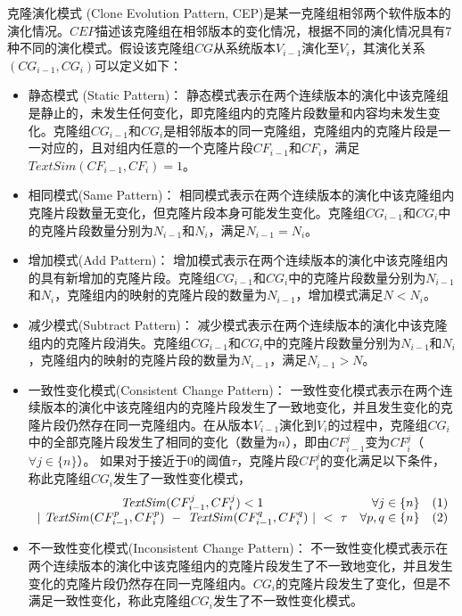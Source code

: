 \begin{definition}[克隆演化模式]
\label{def-evolutionpattern}
克隆演化模式 (Clone Evolution Pattern, CEP)是某一克隆组相邻两个软件版本的演化情况。$CEP$描述该克隆组在相邻版本的变化情况，根据不同的演化情况具有7种不同的演化模式。假设该克隆组$CG$从系统版本$V_{i-1}$演化至$V_{i}$，其演化关系$(CG_{i-1},CG_{i})$可以定义如下：
\begin{itemize}
\item 
静态模式 (Static Pattern)：
静态模式表示在两个连续版本的演化中该克隆组是静止的，未发生任何变化，即克隆组内的克隆片段数量和内容均未发生变化。克隆组$CG_{i-1}$和$CG_{i}$是相邻版本的同一克隆组，克隆组内的克隆片段是一一对应的，且对组内任意的一个克隆片段$CF_{i-1}$和$CF_{i}$，满足$\mathit{TextSim}(CF_{i-1}, CF_i) =1$。

\item 
相同模式(Same Pattern)：
相同模式表示在两个连续版本的演化中该克隆组内克隆片段数量无变化，但克隆片段本身可能发生变化。克隆组$CG_{i-1}$和$CG_{i}$中的克隆片段数量分别为$N_{i-1}$和$N_{i}$，满足$N_{i-1} = N_{i}$。
\item 
增加模式(Add Pattern)：
增加模式表示在两个连续版本的演化中该克隆组内的具有新增加的克隆片段。克隆组$CG_{i-1}$和$CG_{i}$中的克隆片段数量分别为$N_{i-1}$和$N_{i}$，克隆组内的映射的克隆片段的数量为$N_{i-1}$，增加模式满足$N < N_{i}$。
\item 
减少模式(Subtract Pattern)：
减少模式表示在两个连续版本的演化中该克隆组内的克隆片段消失。克隆组$CG_{i-1}$和$CG_{i}$中的克隆片段数量分别为$N_{i-1}$和$N_{i}$，克隆组内的映射的克隆片段的数量为$N_{i-1}$，满足$N_{i-1} > N$。
\item 
一致性变化模式(Consistent Change Pattern)： 
一致性变化模式表示在两个连续版本的演化中该克隆组内的克隆片段发生了一致地变化，并且发生变化的克隆片段仍然存在同一克隆组内。在从版本$V_{i-1}$演化到$V_{i}$的过程中，克隆组$CG_{i}$中的全部克隆片段发生了相同的变化（数量为$n$），即由$CF^{j}_{i-1}$变为$CF^{j}_i$（$\forall j \in \{n\}$）。  如果对于接近于0的阈值$\tau$，克隆片段$CF^{j}_i$的变化满足以下条件，称此克隆组$CG_{i}$发生了一致性变化模式， 
  \[
  \begin{array}[t]{crl}
    \mathit{TextSim}(CF^{j}_{i-1}, CF^{j}_{i}) < 1 & \forall j \in \{n\} &(1) \\
    {| ~\mathit{TextSim}(CF^{p}_{i-1},CF^{p}_{i})  ~-~ \mathit{TextSim}(CF^{q}_{i-1},CF^{q}_{i}) ~| ~< ~ \tau}  & \forall {p,q} \in \{n\}& (2)
  \end{array}
  \]
  
\item 
不一致性变化模式(Inconsistent Change Pattern)：
不一致性变化模式表示在两个连续版本的演化中该克隆组内的克隆片段发生了不一致地变化，并且发生变化的克隆片段仍然存在同一克隆组内。$CG_{i}$的克隆片段发生了变化，但是不满足一致性变化，称此克隆组$CG_{i}$发生了不一致性变化模式。


\end{itemize}
\end{definition}
